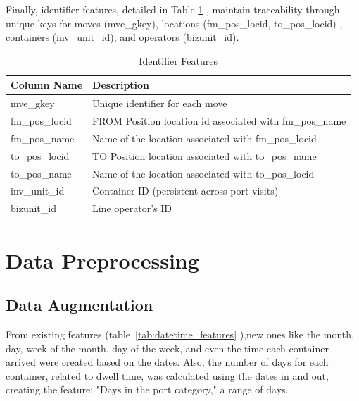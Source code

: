 		Finally, identifier features, detailed in Table \ref{tab:identifier_features}
		, maintain traceability through unique keys for moves (mve\_gkey), locations (fm\_pos\_locid,
		to\_pos\_locid)
		, containers (inv\_unit\_id), and operators (bizunit\_id).

		\begin{table}[H]
			\centering
			\begin{tabular}{p{}p{}}
				\hline
				\textbf{Column Name} & \textbf{Description}                                    \\
				\hline
				mve\_gkey                & Unique identifier for each move                         \\
				\hline
				fm\_pos\_locid           & FROM Position location id associated with fm\_pos\_name \\
				\hline
				fm\_pos\_name            & Name of the location associated with fm\_pos\_locid     \\
				\hline
				to\_pos\_locid           & TO Position location associated with to\_pos\_name      \\
				\hline
				to\_pos\_name            & Name of the location associated with to\_pos\_locid     \\
				\hline
				inv\_unit\_id            & Container ID (persistent across port visits)            \\
				\hline
				bizunit\_id              & Line operator's ID                                      \\
				\hline
			\end{tabular}
			\caption{Identifier Features}
			\label{tab:identifier_features}
		\end{table}


	\section{Data Preprocessing}

		\subsection{Data Augmentation}

			From existing features (table~\ref{tab:datetime_features}
			),new ones like the month, day, week of the month, day of the week, and even the time each container
			arrived were created based on the dates. Also, the number of days for each container, related to dwell
			time, was calculated using the dates in and out, creating the feature: "Days in the port category," a range
			of days.

